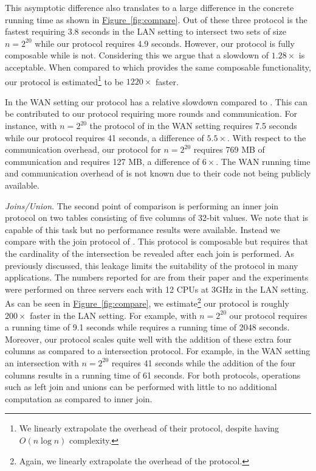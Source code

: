 \documentclass[11pt,letterpaper]{article}
\newcommand{\namedref}[2]{\hyperref[#2]{#1~\ref*{#2}}}
\newcommand{\figureref}[1]{\namedref{Figure}{#1}}
\renewcommand{\paragraph}[1]{\vspace{0.1cm}\noindent\emph{#1}.}
\begin{document}
This asymptotic difference also translates to a large difference in the concrete running time as shown in \figureref{fig:compare}. Out of these three protocol \cite{CCS:KKRT16} is the fastest requiring 3.8 seconds in the LAN setting to intersect two sets of size $n=2^{20}$ while our protocol requires 4.9 seconds. However, our protocol is fully composable while \cite{CCS:KKRT16} is not. Considering this we argue that a slowdown of $1.28\times$ is acceptable. When compared to \cite{ASIACCS:BlaAgu12} which provides the same composable functionality, our protocol is estimated\footnote{We linearly extrapolate the overhead of their protocol, despite having $O(n\log n)$ complexity.} to be $1220\times$ faster.

In the WAN setting our protocol has a relative slowdown compared to \cite{CCS:KKRT16}. This can be contributed to our protocol requiring more rounds and communication. For instance, with $n=2^{20}$ the protocol of \cite{CCS:KKRT16} in the WAN setting requires 7.5 seconds while our protocol requires 41 seconds, a difference of $5.5\times$. With respect to the communication overhead, our protocol for $n=2^{20}$ requires 769 MB of communication and \cite{CCS:KKRT16} requires 127 MB, a difference of $6\times$. The WAN running time and communication overhead of \cite{ASIACCS:BlaAgu12} is not known due to their code not being publicly available.


\paragraph{Joins/Union} 
The second point of comparison is performing an inner join protocol on two tables consisting of five columns of 32-bit values. We note that \cite{ASIACCS:BlaAgu12} is capable of this task but no performance results were available. Instead we compare with the join protocol of \cite{LTW13}. This protocol is composable but requires that the cardinality of the intersection be revealed after each join is performed. As previously discussed, this leakage limits the suitability of the protocol in many applications. The numbers reported for \cite{LTW13} are from their paper and the experiments were performed on three servers each with 12 CPUs at 3GHz in the LAN setting. As can be seen in \figureref{fig:compare}, we estimate\footnote{Again, we linearly extrapolate the overhead of the protocol.} our protocol is roughly $200\times$ faster in the LAN setting. For example, with $n=2^{20}$ our protocol requires a running time of 9.1 seconds while \cite{LTW13} requires a running time of 2048 seconds. Moreover, our protocol scales quite well with the addition of these extra four columns as compared to a intersection protocol. For example, in the WAN setting an intersection with $n=2^{20}$ requires 41 seconds while the addition of the four columns results in a  running time of 61 seconds. For both protocols, operations such as left join and unions can be performed with little to no additional computation as compared to inner join.
\end{document}
